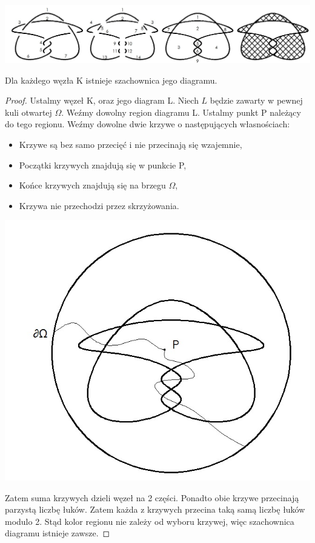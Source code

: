 			\includegraphics[scale=0.3]{2/Obrazy/ArcRegion3} \\



\begin{lemat}
Dla każdego węzła K istnieje szachownica jego diagramu.  
\end{lemat}
\begin{proof}
Ustalmy węzeł K, oraz jego diagram L. Niech $L$ będzie zawarty w pewnej kuli otwartej $\Omega$.
Weźmy dowolny region diagramu L. Ustalmy punkt P należący do tego regionu. Weźmy dowolne dwie krzywe o następujących własnościach:




	\begin{minipage}{0.5\textwidth}
\begin{itemize}
\item Krzywe są bez samo przecięć i nie przecinają się wzajemnie,
\item Początki krzywych znajdują się w punkcie P,
\item Końce krzywych znajdują się na brzegu $\Omega$,
\item Krzywa nie przechodzi przez skrzyżowania.	
\end{itemize}
	\end{minipage}
	\begin{minipage}{0.5\textwidth}
		\begin{center}
			\includegraphics[scale=0.3]{2/Obrazy/Chesscircle}
		\end{center}
	\end{minipage}
Zatem suma krzywych dzieli węzeł na 2 części. Ponadto obie krzywe przecinają parzystą liczbę łuków. Zatem każda z krzywych przecina taką samą liczbę łuków modulo 2. Stąd kolor regionu nie zależy od wyboru krzywej, więc szachownica diagramu istnieje zawsze. 

\end{proof}
